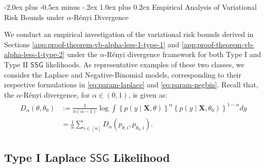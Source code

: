 \documentclass[12pt]{article}
\makeatletter
\def\section{\@startsection{section}{1}{\z@}
  {-2.0ex plus -0.5ex minus -.2ex} %
  {1.0ex plus 0.2ex}               %
  {\normalfont\Large\bfseries}}
\numberwithin{equation}{section}
\makeatother
\begin{document}
\newpage

\section{Empirical Analysis of Variational Risk Bounds under \texorpdfstring{$\alpha$-R\'{e}nyi}{alpha-Renyi} Divergence}\label{sec:empirical-evidence-risk-bounds}

We conduct an empirical investigation of the variational risk bounds derived in Sections \ref{app:proof-theorem-vb-alpha-less-1-type-1} and \ref{app:proof-theorem-vb-alpha-less-1-type-2} under the $\alpha$-R\'{e}nyi divergence framework for both Type I and Type II $\mathsf{SSG}$ likelihoods. As representative examples of these two classes, we consider the Laplace and Negative-Binomial models, corresponding to their respective formulations in \eqref{eq:param-laplace} and \eqref{eq:param-negbin}. Recall that, the $\alpha$-R\'{e}nyi divergence, for $\alpha \in (0,1)$, is given as:
\begin{align}\label{eq:alpha-renyi-divergence}
\begin{split}
    D_{\alpha}(\theta, \theta_0) &:= \frac{1}{n(\alpha-1)}\log \int \left\{p(y\mid \mathbf{X}, \theta)\right\}^{\alpha}\left\{p(y\mid \mathbf{X}, \theta_0)\right\}^{1-\alpha}dy\\
    &= \frac{1}{n}\sum_{i\in [n]}D_{\alpha}(p_{\theta, i}, p_{\theta_0, i}).
\end{split}
\end{align}

\subsection{Type I Laplace \texorpdfstring{$\mathsf{SSG}$}{SSG} Likelihood}
\end{document}
